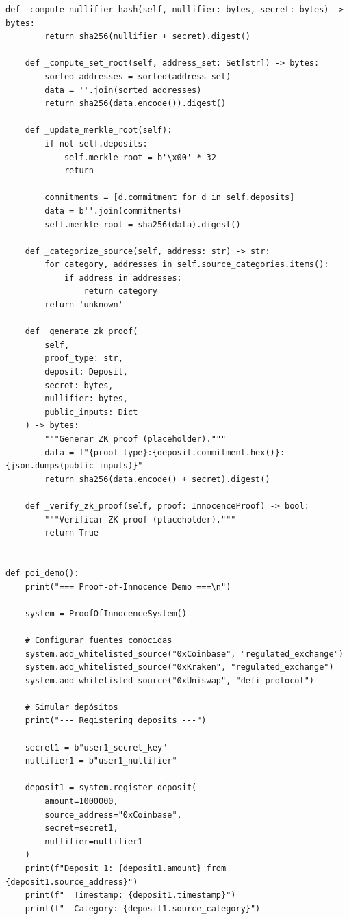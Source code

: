 \documentclass[11pt,a4paper,twoside]{book}
\theoremstyle{definition}
\theoremstyle{remark}
\begin{document}
\begin{lstlisting}[language=circom, caption={Circuito de Proof-of-Innocence temporal}]
    def _compute_nullifier_hash(self, nullifier: bytes, secret: bytes) -> bytes:
        return sha256(nullifier + secret).digest()
    
    def _compute_set_root(self, address_set: Set[str]) -> bytes:
        sorted_addresses = sorted(address_set)
        data = ''.join(sorted_addresses)
        return sha256(data.encode()).digest()
    
    def _update_merkle_root(self):
        if not self.deposits:
            self.merkle_root = b'\x00' * 32
            return
        
        commitments = [d.commitment for d in self.deposits]
        data = b''.join(commitments)
        self.merkle_root = sha256(data).digest()
    
    def _categorize_source(self, address: str) -> str:
        for category, addresses in self.source_categories.items():
            if address in addresses:
                return category
        return 'unknown'
    
    def _generate_zk_proof(
        self, 
        proof_type: str, 
        deposit: Deposit,
        secret: bytes,
        nullifier: bytes,
        public_inputs: Dict
    ) -> bytes:
        """Generar ZK proof (placeholder)."""
        data = f"{proof_type}:{deposit.commitment.hex()}:{json.dumps(public_inputs)}"
        return sha256(data.encode() + secret).digest()
    
    def _verify_zk_proof(self, proof: InnocenceProof) -> bool:
        """Verificar ZK proof (placeholder)."""
        return True


def poi_demo():
    print("=== Proof-of-Innocence Demo ===\n")
    
    system = ProofOfInnocenceSystem()
    
    # Configurar fuentes conocidas
    system.add_whitelisted_source("0xCoinbase", "regulated_exchange")
    system.add_whitelisted_source("0xKraken", "regulated_exchange")
    system.add_whitelisted_source("0xUniswap", "defi_protocol")
    
    # Simular depósitos
    print("--- Registering deposits ---")
    
    secret1 = b"user1_secret_key"
    nullifier1 = b"user1_nullifier"
    
    deposit1 = system.register_deposit(
        amount=1000000,
        source_address="0xCoinbase",
        secret=secret1,
        nullifier=nullifier1
    )
    print(f"Deposit 1: {deposit1.amount} from {deposit1.source_address}")
    print(f"  Timestamp: {deposit1.timestamp}")
    print(f"  Category: {deposit1.source_category}")
    

\end{lstlisting}
\end{document}
